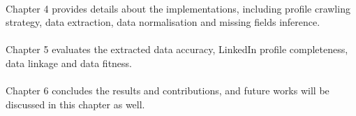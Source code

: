 \paragraph{}
Chapter 4 provides details about the implementations, including profile crawling strategy, data extraction, data normalisation and missing fields inference.
\paragraph{}
Chapter 5 evaluates the extracted data accuracy, LinkedIn profile completeness, data linkage and data fitness.
\paragraph{}
Chapter 6 concludes the results and contributions, and future works will be discussed in this chapter as well.
